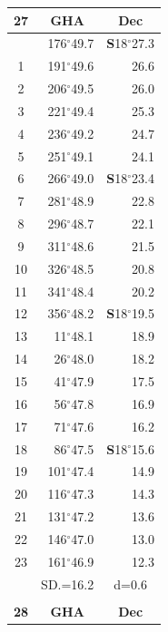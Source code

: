 \documentclass[10pt, a4paper]{report}
\begin{document}
\begin{scriptsize}
\noindent
\begin{tabular*}{0.2\textwidth}[t]{@{\extracolsep{\fill}}|c|rr|}
\hline
\multicolumn{1}{|c|}{\rule{0pt}{2.6ex}\textbf{27}} & \multicolumn{1}{c}{\textbf{GHA}} & \multicolumn{1}{c|}{\textbf{Dec}}\\
\hline\rule{0pt}{2.6ex}\noindent
0 & 176$^\circ$49.7 & \textbf{S}18$^\circ$27.3\\
1 & 191$^\circ$49.6 & 26.6\\
2 & 206$^\circ$49.5 & 26.0\\
3 & 221$^\circ$49.4 & \raisebox{0.24ex}{\boldmath$\cdot$~\boldmath$\cdot$~~}25.3\\
4 & 236$^\circ$49.2 & 24.7\\
5 & 251$^\circ$49.1 & 24.1\\[2Pt]
6 & 266$^\circ$49.0 & \textbf{S}18$^\circ$23.4\\
7 & 281$^\circ$48.9 & 22.8\\
8 & 296$^\circ$48.7 & 22.1\\
9 & 311$^\circ$48.6 & \raisebox{0.24ex}{\boldmath$\cdot$~\boldmath$\cdot$~~}21.5\\
10 & 326$^\circ$48.5 & 20.8\\
11 & 341$^\circ$48.4 & 20.2\\[2Pt]
12 & 356$^\circ$48.2 & \textbf{S}18$^\circ$19.5\\
13 & 11$^\circ$48.1 & 18.9\\
14 & 26$^\circ$48.0 & 18.2\\
15 & 41$^\circ$47.9 & \raisebox{0.24ex}{\boldmath$\cdot$~\boldmath$\cdot$~~}17.5\\
16 & 56$^\circ$47.8 & 16.9\\
17 & 71$^\circ$47.6 & 16.2\\[2Pt]
18 & 86$^\circ$47.5 & \textbf{S}18$^\circ$15.6\\
19 & 101$^\circ$47.4 & 14.9\\
20 & 116$^\circ$47.3 & 14.3\\
21 & 131$^\circ$47.2 & \raisebox{0.24ex}{\boldmath$\cdot$~\boldmath$\cdot$~~}13.6\\
22 & 146$^\circ$47.0 & 13.0\\
23 & 161$^\circ$46.9 & 12.3\\
\hline
\rule{0pt}{2.4ex} & \multicolumn{1}{c}{SD.=16.2} & \multicolumn{1}{c|}{d=0.6}\\
\hline
\multicolumn{1}{c}{}\\[-0.5ex]\hline
\multicolumn{1}{|c|}{\rule{0pt}{2.6ex}\textbf{28}} & \multicolumn{1}{c}{\textbf{GHA}} & \multicolumn{1}{c|}{\textbf{Dec}}\\

\end{tabular*}
\end{scriptsize}
\end{document}

